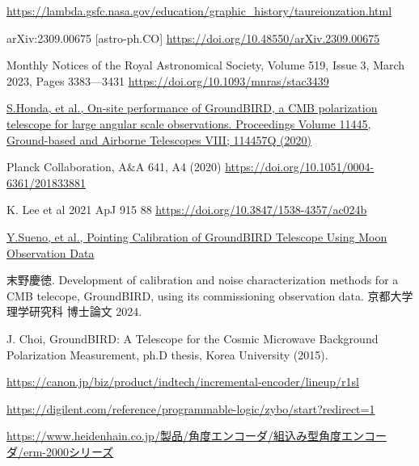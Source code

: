 \begin{thebibliography}{99}
\href{https://lambda.gsfc.nasa.gov/education/graphic\_history/taureionzation.html}{https://lambda.gsfc.nasa.gov/education/graphic\_history/taureionzation.html}

arXiv:2309.00675 [astro-ph.CO]
\href{https://doi.org/10.48550/arXiv.2309.00675}{https://doi.org/10.48550/arXiv.2309.00675}

Monthly Notices of the Royal Astronomical Society, Volume 519, Issue 3, March 2023, Pages 3383—3431
\href{https://doi.org/10.1093/mnras/stac3439}{https://doi.org/10.1093/mnras/stac3439}

\href{https://www.spiedigitallibrary.org/conference-proceedings-of-spie/11445/114457Q/On-site-performance-of-GroundBIRD-a-CMB-polarization-telescope-for/10.1117/12.2560918.short}
{S.Honda, et al., On-site performance of GroundBIRD, a CMB polarization telescope for large angular scale observations. Proceedings Volume 11445, Ground-based and Airborne Telescopes VIII; 114457Q (2020)}

Planck Collaboration, A$\&$A 641, A4 (2020)
\href{https://doi.org/10.1051/0004-6361/201833881}{https://doi.org/10.1051/0004-6361/201833881}

K. Lee et al 2021 ApJ 915 88
\href{https://doi.org/10.3847/1538-4357/ac024b}{https://doi.org/10.3847/1538-4357/ac024b}

\href{https://ui.adsabs.harvard.edu/abs/2024PTEP.2024b3F01S/abstract}
{Y.Sueno, et al., Pointing Calibration of GroundBIRD Telescope Using Moon Observation Data}

末野慶徳. Development of calibration and noise characterization methods for a CMB telecope, GroundBIRD, using its commissioning observation data. 京都大学理学研究科 博士論文 2024.

J. Choi, GroundBIRD: A Telescope for the Cosmic Microwave Background Polarization Measurement, ph.D thesis, Korea University (2015).

\href{https://canon.jp/biz/product/indtech/incremental-encoder/lineup/r1sl}{https://canon.jp/biz/product/indtech/incremental-encoder/lineup/r1sl}

\href{https://digilent.com/reference/programmable-logic/zybo/start?redirect=1}{https://digilent.com/reference/programmable-logic/zybo/start?redirect=1}

\href{https://www.heidenhain.co.jp/製品/角度エンコーダ/組込み型角度エンコーダ/erm-2000シリーズ}{https://www.heidenhain.co.jp/製品/角度エンコーダ/組込み型角度エンコーダ/erm-2000シリーズ}


\end{thebibliography}
